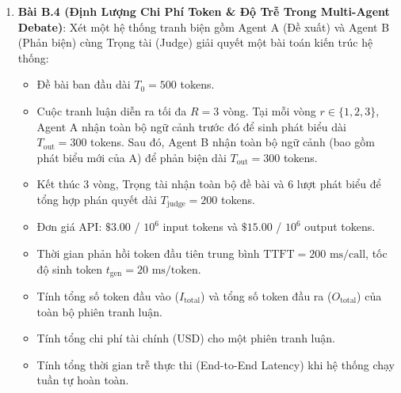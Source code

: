 \begin{enumerate}
  \item \textbf{Bài B.4 (Định Lượng Chi Phí Token \& Độ Trễ Trong Multi-Agent Debate)}:
  Xét một hệ thống tranh biện gồm Agent A (Đề xuất) và Agent B (Phản biện) cùng Trọng tài (Judge) giải quyết một bài toán kiến trúc hệ thống:
  \begin{itemize}
    \item Đề bài ban đầu dài $T_0 = 500$ tokens.
    \item Cuộc tranh luận diễn ra tối đa $R = 3$ vòng. Tại mỗi vòng $r \in \{1, 2, 3\}$, Agent A nhận toàn bộ ngữ cảnh trước đó để sinh phát biểu dài $T_{\text{out}} = 300$ tokens. Sau đó, Agent B nhận toàn bộ ngữ cảnh (bao gồm phát biểu mới của A) để phản biện dài $T_{\text{out}} = 300$ tokens.
    \item Kết thúc 3 vòng, Trọng tài nhận toàn bộ đề bài và 6 lượt phát biểu để tổng hợp phán quyết dài $T_{\text{judge}} = 200$ tokens.
    \item Đơn giá API: $\$3.00$ / $10^6$ input tokens và $\$15.00$ / $10^6$ output tokens.
    \item Thời gian phản hồi token đầu tiên trung bình $\text{TTFT} = 200\text{ ms/call}$, tốc độ sinh token $t_{\text{gen}} = 20\text{ ms/token}$.
  \end{itemize}
  \begin{itemize}
    \item[a)] Tính tổng số token đầu vào ($I_{\text{total}}$) và tổng số token đầu ra ($O_{\text{total}}$) của toàn bộ phiên tranh luận.
    \item[b)] Tính tổng chi phí tài chính (USD) cho một phiên tranh luận.
    \item[c)] Tính tổng thời gian trễ thực thi (End-to-End Latency) khi hệ thống chạy tuần tự hoàn toàn.
  \end{itemize}


\end{enumerate}
